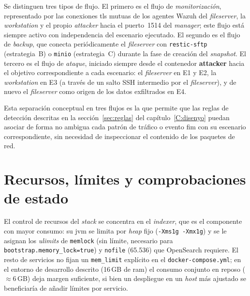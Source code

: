 \documentclass[../main.tex]{subfiles}
\begin{document}
Se distinguen tres tipos de flujo. El primero es el flujo de \emph{monitorización},
representado por las conexiones \gls{tls} mutuas de los agentes Wazuh del
\emph{fileserver}, la \emph{workstation} y el propio \emph{attacker} hacia el
puerto~1514 del \emph{manager}; este flujo está siempre activo con independencia
del escenario ejecutado. El segundo es el flujo de \emph{backup}, que conecta
periódicamente el \emph{fileserver} con \texttt{restic-sftp} (estrategia~B) o
\texttt{minio} (estrategia~C) durante la fase de creación del \emph{snapshot}.
El tercero es el flujo de \emph{ataque}, iniciado siempre desde el contenedor
\textbf{attacker} hacia el objetivo correspondiente a cada escenario: el
\emph{fileserver} en E1 y E2, la \emph{workstation} en E3 (a través de un salto
SSH intermedio por el \emph{fileserver}), y de nuevo el \emph{fileserver} como
origen de los datos exfiltrados en E4.

Esta separación conceptual en tres flujos es la que permite que las reglas de
detección descritas en la sección~\ref{sec:reglas} del capítulo~\ref{C:disenyo}
puedan asociar de forma no ambigua cada patrón de tráfico o evento \gls{fim} con
su escenario correspondiente, sin necesidad de inspeccionar el contenido de los
paquetes de red.

\section{Recursos, límites y comprobaciones de estado}
\label{sec:recursos-healthchecks}

El control de recursos del \emph{stack} se concentra en el \emph{indexer}, que es
el componente con mayor consumo: su \gls{jvm} se limita por \emph{heap} fijo
(\texttt{-Xms1g -Xmx1g}) y se le asignan los \emph{ulimits} de \texttt{memlock}
(sin límite, necesario para \texttt{bootstrap.memory\_lock=true}) y \texttt{nofile}
(65.536) que OpenSearch requiere. El resto de servicios no fijan un
\texttt{mem\_limit} explícito en el \texttt{docker-compose.yml}; en el entorno de
desarrollo descrito (16\,GB de \gls{ram}) el consumo conjunto en reposo
($\approx$6\,GB) deja margen suficiente, si bien un despliegue en un \emph{host}
más ajustado se beneficiaría de añadir límites por servicio.
\end{document}
